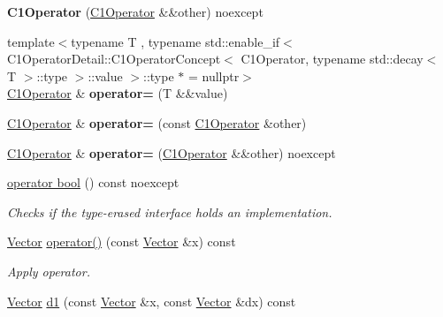 \begin{DoxyCompactItemize}
\item 
\hypertarget{classSpacy_1_1C1Operator_ac75138b84319896392feea5baa7c333e}{{\bfseries \-C1\-Operator} (\hyperlink{classSpacy_1_1C1Operator}{\-C1\-Operator} \&\&other) noexcept}\label{classSpacy_1_1C1Operator_ac75138b84319896392feea5baa7c333e}

\item 
\hypertarget{classSpacy_1_1C1Operator_aecfc71bf5da728a9028a586e50afbfcf}{{\footnotesize template$<$typename T , typename std\-::enable\-\_\-if$<$ C1\-Operator\-Detail\-::\-C1\-Operator\-Concept$<$ C1\-Operator, typename std\-::decay$<$ T $>$\-::type $>$\-::value $>$\-::type $\ast$  = nullptr$>$ }\\\hyperlink{classSpacy_1_1C1Operator}{\-C1\-Operator} \& {\bfseries operator=} (\-T \&\&value)}\label{classSpacy_1_1C1Operator_aecfc71bf5da728a9028a586e50afbfcf}

\item 
\hypertarget{classSpacy_1_1C1Operator_aff6bc2122b654f9df5e8a05dff4ae494}{\hyperlink{classSpacy_1_1C1Operator}{\-C1\-Operator} \& {\bfseries operator=} (const \hyperlink{classSpacy_1_1C1Operator}{\-C1\-Operator} \&other)}\label{classSpacy_1_1C1Operator_aff6bc2122b654f9df5e8a05dff4ae494}

\item 
\hypertarget{classSpacy_1_1C1Operator_abc661d2a55983098267ddd90bd9673eb}{\hyperlink{classSpacy_1_1C1Operator}{\-C1\-Operator} \& {\bfseries operator=} (\hyperlink{classSpacy_1_1C1Operator}{\-C1\-Operator} \&\&other) noexcept}\label{classSpacy_1_1C1Operator_abc661d2a55983098267ddd90bd9673eb}

\item 
\hyperlink{classSpacy_1_1C1Operator_a4efdf099aac5f0b101c69cc8c9c8a48b}{operator bool} () const noexcept
\begin{DoxyCompactList}\small\item\em \-Checks if the type-\/erased interface holds an implementation. \end{DoxyCompactList}\item 
\hypertarget{classSpacy_1_1C1Operator_a2a01bf08bf2b6e44955cd606aa3db91d}{\hyperlink{classSpacy_1_1Vector}{\-Vector} \hyperlink{classSpacy_1_1C1Operator_a2a01bf08bf2b6e44955cd606aa3db91d}{operator()} (const \hyperlink{classSpacy_1_1Vector}{\-Vector} \&x) const }\label{classSpacy_1_1C1Operator_a2a01bf08bf2b6e44955cd606aa3db91d}

\begin{DoxyCompactList}\small\item\em \-Apply operator. \end{DoxyCompactList}\item 
\hypertarget{classSpacy_1_1C1Operator_a1b6a06c88bc4168c750ee4ffdc81f1dd}{\hyperlink{classSpacy_1_1Vector}{\-Vector} \hyperlink{classSpacy_1_1C1Operator_a1b6a06c88bc4168c750ee4ffdc81f1dd}{d1} (const \hyperlink{classSpacy_1_1Vector}{\-Vector} \&x, const \hyperlink{classSpacy_1_1Vector}{\-Vector} \&dx) const }\label{classSpacy_1_1C1Operator_a1b6a06c88bc4168c750ee4ffdc81f1dd}


\end{DoxyCompactItemize}
